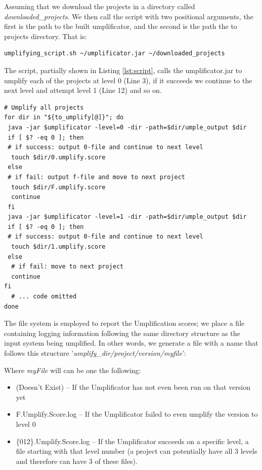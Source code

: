 Assuming that we download the projects in a directory called \textit{downloaded\_projects}. We then call the script with two positional arguments, the first is the path to the built umplificator, and the second is the path the to projects directory. That is:

\vspace{\baselineskip}
\begin{lstlisting}[style=umplePlain]
   umplifying_script.sh ~/umplificator.jar ~/downloaded_projects
\end{lstlisting}

The script, partially shown in Listing \ref{lst:script}, calls the umplificator.jar to umplify each of the projects at level 0 (Line 3), if it succeeds we continue to the next level and attempt level 1 (Line 12) and so on. 

\begin{lstlisting}[style=mine, label=lst:script, caption=Part of the script responsible to umplify and report results]
# Umplify all projects
for dir in "${to_umplify[@]}"; do
 java -jar $umplificator -level=0 -dir -path=$dir/umple_output $dir
 if [ $? -eq 0 ]; then 
 # if success: output 0-file and continue to next level
  touch $dir/0.umplify.score
 else 
 # if fail: output f-file and move to next project
  touch $dir/F.umplify.score
  continue
 fi
 java -jar $umplificator -level=1 -dir -path=$dir/umple_output $dir 
 if [ $? -eq 0 ]; then 
 # if success: output 0-file and continue to next level
  touch $dir/1.umplify.score
 else 
  # if fail: move to next project
  continue
fi
  # ... code omitted
done
\end{lstlisting}

The file system is employed to report the Umplification scores; we place a file containing logging information following the same directory structure as the input system being umplified. In other words, 
we generate a file with a name that follows this structure '\textit{umplify\_dir/project/version/myfile}':

Where \textit{myFile} will can be one the following:
\begin{itemize}
\item (Doesn't Exist) -- If the Umplificator has not even been run on that version yet
\item F.Umplify.Score.log -- If the Umplificator failed to even umplify the version to level 0
\item \{012\}.Umplify.Score.log -- If the Umplificator succeeds on a specific level, a file starting with that level number (a project can potentially have all 3 levels and therefore can have 3 of these files).
\end{itemize}

